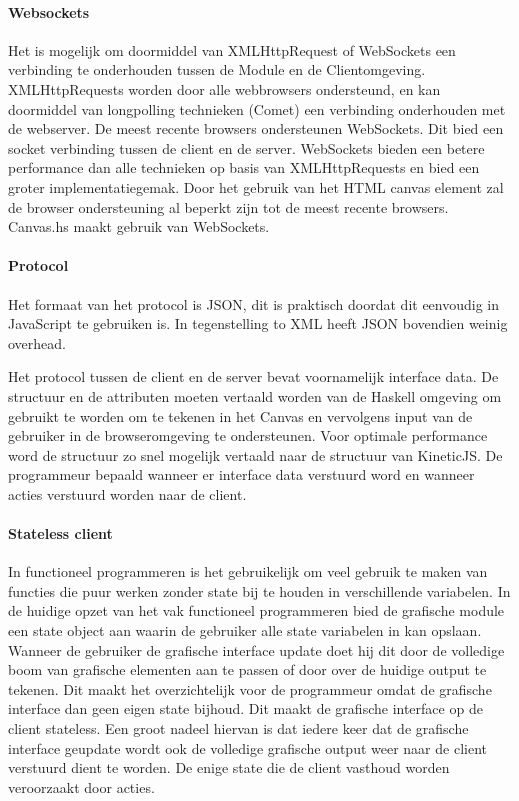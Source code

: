 \paragraph{Websockets}
Het is mogelijk om doormiddel van XMLHttpRequest of WebSockets een verbinding te onderhouden tussen de Module en de Clientomgeving. XMLHttpRequests worden door alle webbrowsers ondersteund, en kan doormiddel van longpolling technieken (Comet) een verbinding onderhouden met de webserver. De meest recente browsers ondersteunen WebSockets. Dit bied een socket verbinding tussen de client en de server. WebSockets bieden een betere performance dan alle technieken op basis van XMLHttpRequests en bied een groter implementatiegemak. Door het gebruik van het HTML canvas element zal de browser ondersteuning al beperkt zijn tot de meest recente browsers. Canvas.hs maakt gebruik van WebSockets.

\paragraph{Protocol}
Het formaat van het protocol is JSON, dit is praktisch doordat dit eenvoudig in JavaScript te gebruiken is. In tegenstelling to XML heeft JSON bovendien weinig overhead.

Het protocol tussen de client en de server bevat voornamelijk interface data. De structuur en de attributen moeten vertaald worden van de Haskell omgeving om gebruikt te worden om te tekenen in het Canvas en vervolgens input van de gebruiker in de browseromgeving te ondersteunen. Voor optimale performance word de structuur zo snel mogelijk vertaald naar de structuur van KineticJS. De programmeur bepaald wanneer er interface data verstuurd word en wanneer acties verstuurd worden naar de client.

\paragraph{Stateless client}
In functioneel programmeren is het gebruikelijk om veel gebruik te maken van functies die puur werken zonder state bij te houden in verschillende variabelen. In de huidige opzet van het vak functioneel programmeren bied de grafische module een state object aan waarin de gebruiker alle state variabelen in kan opslaan. Wanneer de gebruiker de grafische interface update doet hij dit door de volledige boom van grafische elementen aan te passen of door over de huidige output te tekenen. Dit maakt het overzichtelijk voor de programmeur omdat de grafische interface dan geen eigen state bijhoud. Dit maakt de grafische interface op de client stateless. Een groot nadeel hiervan is dat iedere keer dat de grafische interface geupdate wordt ook de volledige grafische output weer naar de client verstuurd dient te worden. De enige state die de client vasthoud worden veroorzaakt door acties.

